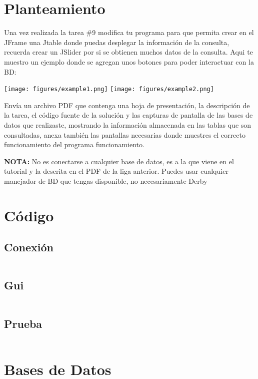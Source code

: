 \documentclass[12pt]{article}
\author{Pablo Vargas Bermúdez}
\begin{document}
\pagestyle{empty}


\section*{Planteamiento}

Una vez realizada la tarea \#9 modifica tu programa para que permita
crear en el JFrame una Jtable donde puedas desplegar la información de
la consulta, recuerda crear un JSlider por si se obtienen muchos datos
de la consulta.  Aqui te muestro un ejemplo donde se agregan unos
botones para poder interactuar con la BD:

\begin{center}
  \texttt{[image: figures/example1.png]}
  \texttt{[image: figures/example2.png]}
\end{center}


Envía un archivo PDF que contenga una hoja de presentación, la
descripción de la tarea, el código fuente de la solución y las
capturas de pantalla de las bases de datos que realizaste, mostrando
la información almacenada en las tablas que son consultadas, anexa
también las pantallas necesarias donde muestres el correcto
funcionamiento del programa funcionamiento.

\textbf{NOTA:} No es conectarse a cualquier base de datos, es a la que viene en
el tutorial y la descrita en el PDF de la liga anterior. Puedes usar
cualquier manejador de BD que tengas disponible, no necesariamente
Derby

\section*{Código}

\subsection*{Conexión}
\inputminted{Java}{DataBase.java}
\subsection*{Gui}
\inputminted{Java}{Gui.java}
\subsection*{Prueba}
\inputminted{Java}{PruebaDataBase.java}

\pagebreak
\section*{Bases de Datos}
\end{document}
